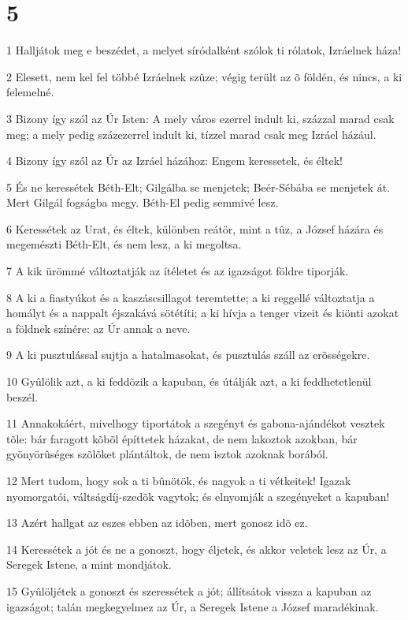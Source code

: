 \chapter{5}

\par 1 Halljátok meg e beszédet, a melyet síródalként szólok ti rólatok, Izráelnek háza!
\par 2 Elesett, nem kel fel többé Izráelnek szûze; végig terült az õ földén, és nincs, a ki felemelné.
\par 3 Bizony így szól az Úr Isten: A mely város ezerrel indult ki, százzal marad csak meg; a mely pedig százezerrel indult ki, tízzel marad csak meg Izráel házául.
\par 4 Bizony így szól az Úr az Izráel házához: Engem keressetek, és éltek!
\par 5 És ne keressétek Béth-Elt; Gilgálba se menjetek; Beér-Sébába se menjetek át. Mert Gilgál fogságba megy. Béth-El  pedig semmivé lesz.
\par 6 Keressétek az Urat, és éltek, különben reátör, mint a tûz, a József házára és megemészti Béth-Elt, és nem lesz, a ki megoltsa.
\par 7 A kik ürömmé változtatják az ítéletet és az igazságot földre tiporják.
\par 8 A ki a fiastyúkot és a kaszáscsillagot teremtette; a ki reggellé változtatja a homályt és a nappalt éjszakává sötétíti; a ki hívja a tenger vizeit és kiönti azokat a földnek színére: az Úr annak a neve.
\par 9 A ki pusztulással sujtja a hatalmasokat, és pusztulás száll az erõsségekre.
\par 10 Gyûlölik azt, a ki feddõzik a kapuban, és útálják azt, a ki feddhetetlenül beszél.
\par 11 Annakokáért, mivelhogy tiportátok a szegényt és gabona-ajándékot vesztek tõle: bár faragott kõbõl építtetek házakat, de nem lakoztok azokban, bár gyönyörûséges szõlõket plántáltok, de nem isztok azoknak borából.
\par 12 Mert tudom, hogy sok a ti bûnötök, és nagyok a ti vétkeitek! Igazak nyomorgatói, váltságdíj-szedõk vagytok; és elnyomják a szegényeket a kapuban!
\par 13 Azért hallgat az eszes ebben az idõben, mert gonosz idõ ez.
\par 14 Keressétek a jót és ne a gonoszt, hogy éljetek, és akkor veletek lesz az Úr, a Seregek Istene, a mint mondjátok.
\par 15 Gyûlöljétek a gonoszt és szeressétek a jót; állítsátok vissza a kapuban az igazságot; talán megkegyelmez az Úr, a Seregek Istene a József maradékinak.
